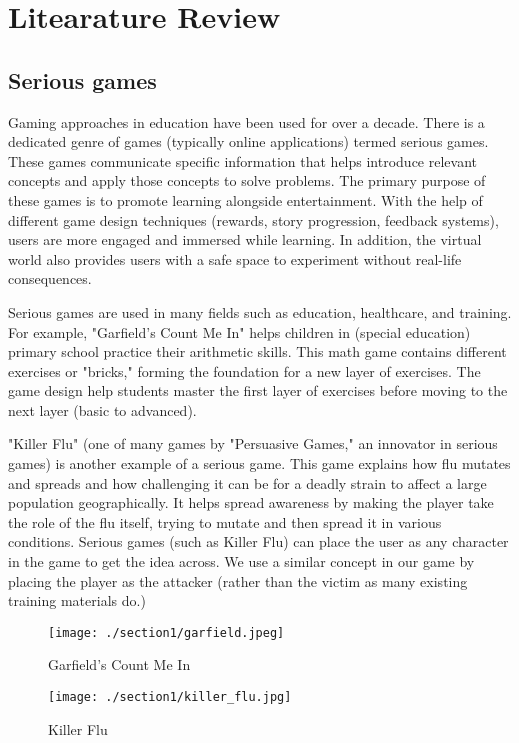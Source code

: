 \section{Litearature Review}

\subsection{Serious games}
Gaming approaches in education have been used for over a decade\cite{almeida_2012}. There is a dedicated genre of games (typically online applications) termed serious games. These games communicate specific information that helps introduce relevant concepts and apply those concepts to solve problems. The primary purpose of these games is to promote learning alongside entertainment. With the help of different game design techniques (rewards, story progression, feedback systems), users are more engaged and immersed while learning. In addition, the virtual world also provides users with a safe space to experiment without real-life consequences.

Serious games are used in many fields such as education, healthcare, and training. For example, "Garfield's Count Me In" \cite{count_me_in} helps children in (special education) primary school practice their arithmetic skills. This math game contains different exercises or "bricks," forming the foundation for a new layer of exercises. The game design help students master the first layer of exercises before moving to the next layer (basic to advanced).

"Killer Flu" \cite{killer_flu} (one of many games by "Persuasive Games," an innovator in serious games) is another example of a serious game. This game explains how flu mutates and spreads and how challenging it can be for a deadly strain to affect a large population geographically. It helps spread awareness by making the player take the role of the flu itself, trying to mutate and then spread it in various conditions. Serious games (such as Killer Flu) can place the user as any character in the game to get the idea across. We use a similar concept in our game by placing the player as the attacker (rather than the victim as many existing training materials do.)

\begin{figure}[h]
    \centering
    \begin{minipage}{0.49\textwidth}
        \centering
        \texttt{[image: ./section1/garfield.jpeg]}
        \caption{Garfield's Count Me In}
    \end{minipage} \hfill
    \begin{minipage}{0.49\textwidth}
        \centering
        \texttt{[image: ./section1/killer\_flu.jpg]}
        \caption{Killer Flu}
    \end{minipage} \hfill
\end{figure}

